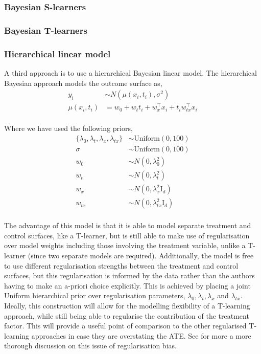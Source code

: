 \documentclass[12pt, a4paper]{article}
\begin{document}
\subsubsection*{Bayesian S-learners}

\subsubsection*{Bayesian T-learners}

\subsubsection*{Hierarchical linear model}

A third approach is to use a hierarchical Bayesian linear model. The hierarchical Bayesian approach models the outcome surface as,
\begin{align*}
y_i &\sim N(\mu(x_i,t_i),\sigma^2) \\
\mu(x_i,t_i) &= w_0 + w_t t_i + w_x^\top x_i + t_i w_{tx}^\top x_i \\
\end{align*}

Where we have used the following priors,
\begin{align*}
\{ \lambda_0, \lambda_t, \lambda_x, \lambda_{tx} \} &\sim 
  \textrm{Uniform}(0, 100) \\
\sigma &\sim \textrm{Uniform}(0, 100) \\
w_0 &\sim N(0,\lambda_0^2) \\
w_t &\sim N(0,\lambda_t^2) \\
w_x &\sim N(0,\lambda_x^2 \textrm{I}_d) \\
w_{tx} &\sim N(0,\lambda^2_{tx} \textrm{I}_d) \\
\end{align*}
 
The advantage of this model is that it is able to model separate treatment and
control surfaces, like a T-learner, but is still able to make use of
regularisation over model weights including those involving the treatment
variable, unlike a T-learner (since two separate models are required).
Additionally, the model is free to use different regularisation strengths
between the treatment and control surfaces, but this regularisation is informed
by the data rather than the authors having to make an a-priori choice
explicitly. This is achieved by placing a joint Uniform hierarchical prior over
regularisation parameters, $\lambda_0, \lambda_t, \lambda_x$ and
$\lambda_{tx}$. Ideally, this construction will allow for the modelling
flexibility of a T-learning approach, while still being able to regularise the
contribution of the treatment factor. This will provide a useful point of
comparison to the other regularised T-learning approaches in case they are
overstating the ATE. See \citet{hahn2018} for more a more thorough discussion
on this issue of regularisation bias.
\end{document}
